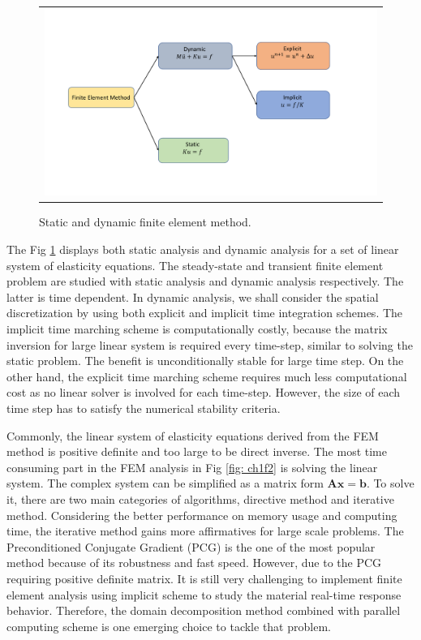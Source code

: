 \begin{figure}[H]
	\centering
	\begin{tabular}{c}
		\includegraphics[width=1.1\textwidth]{./pics/fem}
	\end{tabular}
	\caption{\footnotesize Static and dynamic finite element method.} \label{fig: ch1f3}
\end{figure}

The Fig \ref{fig: ch1f3} displays both static analysis and dynamic analysis for a set of linear system of elasticity equations. The steady-state and transient finite element problem are studied with static analysis and dynamic analysis respectively. The latter is time dependent. In dynamic analysis, we shall consider the spatial discretization by using both explicit and implicit time integration schemes\cite{bathe2008finite}. The implicit time marching scheme is computationally costly, because the matrix inversion for large linear system is required every time-step, similar to solving the static problem. The benefit is unconditionally stable for large time step. On the other hand, the explicit time marching scheme requires much less computational cost as no linear solver is involved for each time-step. However, the size of each time step has to satisfy the numerical stability criteria. 


Commonly, the linear system of elasticity equations derived from the FEM method is positive definite and too large to be direct inverse. The most time consuming part in the FEM analysis in Fig \ref{fig: ch1f2} is solving the linear system. The complex system can be simplified as a matrix form $ \mathbf{A} \mathbf{x} = \mathbf{b} $. To solve it, there are two main categories of algorithms, directive method and iterative method. Considering the better performance on memory usage and computing time, the iterative method gains more affirmatives\cite{brussino1989comparison} for large scale problems. The Preconditioned Conjugate Gradient (PCG) is the one of the most popular method because of its robustness and fast speed. However, due to the PCG requiring positive definite matrix. It is still very challenging to implement finite element analysis using implicit scheme to study the material real-time response behavior. Therefore, the domain decomposition method combined with parallel computing scheme is one emerging choice to tackle that problem.

